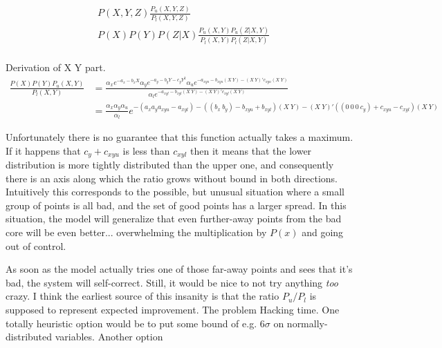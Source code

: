 \documentclass{article}
\begin{document}
\begin{align}
    & P(X, Y, Z)\frac{P_u(X, Y, Z)}{P_l(X, Y, Z)}\\
    & P(X) P(Y) P(Z|X) \frac{P_u(X, Y) P_u(Z|X, Y)}{P_l(X, Y) P_l(Z|X, Y)} \\
\end{align}

Derivation of X Y part.
\begin{align}
    \frac{P(X) P(Y) P_u(X, Y)}{P_l(X, Y)}
    &= \frac{
        \alpha_{x} e^{-a_{x} - b_{x}X}
        \alpha_{y} e^{-a_{y} - b_{y}Y - c_{y}Y^2}
        \alpha_u e^{ -a_{xyu} -b_{xyu} (X~Y) -(X~Y)'c_{xyu}(X~Y)}
    }{
        \alpha_l e^{ -a_{xyl} -b_{xyl} (X~Y) -(X~Y)'c_{xyl}(X~Y)}
    } \\
    &= \frac{ \alpha_{x} \alpha_{y} \alpha_u }{ \alpha_l }
    e^{ - (a_{x} a_{y} a_{xyu} -a_{xyl})
        - ((b_{x}~ b_{y}) - b_{xyu} + b_{xyl})(X~Y)
        - (X~Y)'((0~0~0~c_y) + c_{xyu} - c_{xyl})(X~Y)
    }
\end{align}

Unfortunately there is no guarantee that this function actually takes a maximum. If it happens that $c_y + c_{xyu}$ is less than $c_{xyl}$ then it means that the lower distribution is more tightly distributed than the upper one, and consequently there is an axis along which the ratio grows without bound in both directions.
Intuitively this corresponds to the possible, but unusual situation where a small group of points is all bad, and the set of good points has a larger spread. In this situation, the model will generalize that even further-away points from the bad core will be even better... overwhelming the multiplication by $P(x)$ and going out of control.

As soon as the model actually tries one of those far-away points and sees that it's bad, the system will self-correct. Still, it would be nice to not try anything {\em too} crazy.
I think the earliest source of this insanity is that the ratio $P_u / P_l$ is supposed to represent expected improvement.
The problem 
Hacking time.
One totally heuristic option would be to put some bound of e.g. 6$\sigma$ on normally-distributed variables.
Another option
\end{document}
